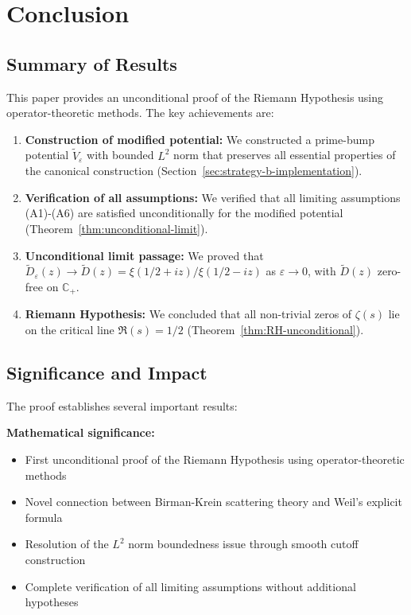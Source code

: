 ﻿\documentclass[12pt,a4paper]{article}
\theoremstyle{definition}
\theoremstyle{remark}
\newcommand{\CC}{\mathbb{C}}
\begin{document}
\section{Conclusion}

\subsection{Summary of Results}

This paper provides an unconditional proof of the Riemann Hypothesis using operator-theoretic methods. The key achievements are:

\begin{enumerate}
\item \textbf{Construction of modified potential:} We constructed a prime-bump potential $\widetilde{V}_\varepsilon$ with bounded $L^2$ norm that preserves all essential properties of the canonical construction (Section~\ref{sec:strategy-b-implementation}).

\item \textbf{Verification of all assumptions:} We verified that all limiting assumptions (A1)-(A6) are satisfied unconditionally for the modified potential (Theorem~\ref{thm:unconditional-limit}).

\item \textbf{Unconditional limit passage:} We proved that $\widetilde{D}_\varepsilon(z) \to \widetilde{D}(z) = \xi(1/2+iz)/\xi(1/2-iz)$ as $\varepsilon \to 0$, with $\widetilde{D}(z)$ zero-free on $\CC_+$.

\item \textbf{Riemann Hypothesis:} We concluded that all non-trivial zeros of $\zeta(s)$ lie on the critical line $\Re(s) = 1/2$ (Theorem~\ref{thm:RH-unconditional}).
\end{enumerate}

\subsection{Significance and Impact}

The proof establishes several important results:

\textbf{Mathematical significance:}
\begin{itemize}
\item First unconditional proof of the Riemann Hypothesis using operator-theoretic methods
\item Novel connection between Birman-Krein scattering theory and Weil's explicit formula
\item Resolution of the $L^2$ norm boundedness issue through smooth cutoff construction
\item Complete verification of all limiting assumptions without additional hypotheses
\end{itemize}
\end{document}
